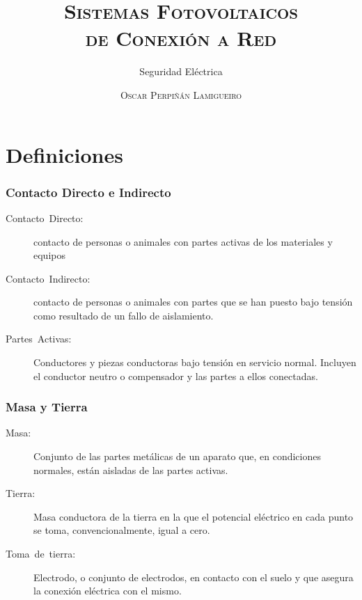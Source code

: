 \documentclass[serif, xcolor=dvipsnames]{beamer}
\begin{document}
\title[\textsc{SFCR: Seguridad Eléctrica}]{\textsc{Sistemas Fotovoltaicos }\\
\textsc{de Conexión a Red}}


\subtitle{Seguridad Eléctrica}


\author{\textsc{Oscar Perpiñán Lamigueiro}}
\date{}

\frame[plain]{\titlepage}


%

\section{Definiciones}


\begin{frame}
\frametitle{Contacto Directo e Indirecto}
\begin{description}
\item [{Contacto~Directo:}] contacto de personas o animales con partes
activas de los materiales y equipos
\item [{Contacto~Indirecto:}] contacto de personas o animales con partes
que se han puesto bajo tensión como resultado de un fallo de aislamiento.
\item [{Partes~Activas:}] Conductores y piezas conductoras bajo tensión
en servicio normal. Incluyen el conductor neutro o compensador y las
partes a ellos conectadas.
\end{description}

\end{frame}

\begin{frame}
\frametitle{Masa y Tierra}
\begin{description}
\item [{Masa:}] Conjunto de las partes metálicas de un aparato que, en
condiciones normales, están aisladas de las partes activas.
\item [{Tierra:}] Masa conductora de la tierra en la que el potencial eléctrico
en cada punto se toma, convencionalmente, igual a cero.
\item [{Toma~de~tierra:}] Electrodo, o conjunto de electrodos, en contacto
con el suelo y que asegura la conexión eléctrica con el mismo.
\end{description}

\end{frame}
\end{document}
